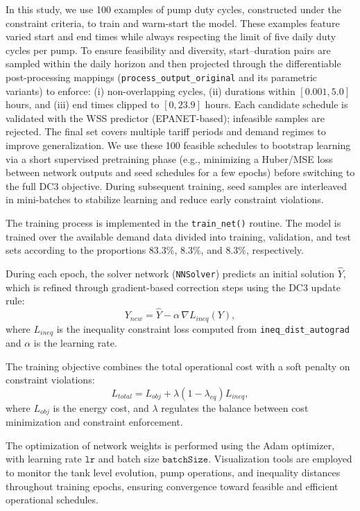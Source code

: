 In this study, we use 100 examples of pump duty cycles, constructed under the constraint criteria, to train and warm-start the model. These examples feature varied start and end times while always respecting the limit of five daily duty cycles per pump. To ensure feasibility and diversity, start–duration pairs are sampled within the daily horizon and then projected through the differentiable post-processing mappings (\texttt{process\_output\_original} and its parametric variants) to enforce: (i) non-overlapping cycles, (ii) durations within $[0.001, 5.0]$ hours, and (iii) end times clipped to $[0, 23.9]$ hours. Each candidate schedule is validated with the WSS predictor (EPANET-based); infeasible samples are rejected. The final set covers multiple tariff periods and demand regimes to improve generalization. We use these 100 feasible schedules to bootstrap learning via a short supervised pretraining phase (e.g., minimizing a Huber/MSE loss between network outputs and seed schedules for a few epochs) before switching to the full DC3 objective. During subsequent training, seed samples are interleaved in mini-batches to stabilize learning and reduce early constraint violations.

The training process is implemented in the \texttt{train\_net()} routine. The model is trained over the available demand data divided into training, validation, and test sets according to the proportions $83.3\%$, $8.3\%$, and $8.3\%$, respectively.

During each epoch, the solver network (\texttt{NNSolver}) predicts an initial solution $\hat{Y}$, which is refined through gradient-based correction steps using the DC3 update rule:
\[
Y_{new} = \hat{Y} - \alpha \, \nabla L_{ineq}(Y),
\]
where $L_{ineq}$ is the inequality constraint loss computed from \texttt{ineq\_dist\_autograd} and $\alpha$ is the learning rate.

The training objective combines the total operational cost with a soft penalty on constraint violations:
\[
L_{total} = L_{obj} + \lambda (1 - \lambda_{eq}) L_{ineq},
\]
where $L_{obj}$ is the energy cost, and $\lambda$ regulates the balance between cost minimization and constraint enforcement.


The optimization of network weights is performed using the Adam optimizer, with learning rate $\texttt{lr}$ and batch size $\texttt{batchSize}$. Visualization tools are employed to monitor the tank level evolution, pump operations, and inequality distances throughout training epochs, ensuring convergence toward feasible and efficient operational schedules.

